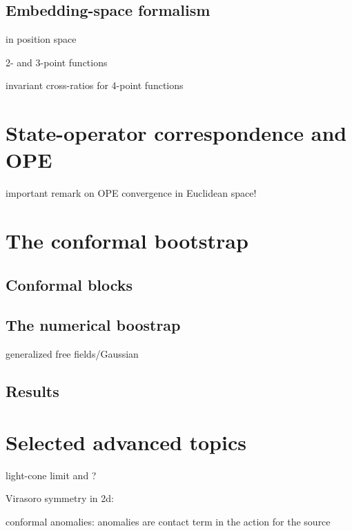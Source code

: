 \documentclass[a4paper,12pt]{article}
\numberwithin{equation}{section}
\begin{document}
\subsection{Embedding-space formalism}

in position space

2- and 3-point functions

invariant cross-ratios for 4-point functions


\section{State-operator correspondence and OPE}

important remark on OPE convergence in Euclidean space!


\section{The conformal bootstrap}

\subsection{Conformal blocks}

\subsection{The numerical boostrap}

generalized free fields/Gaussian

\subsection{Results}



\section{Selected advanced topics}

light-cone limit and ?

Virasoro symmetry in 2d:


conformal anomalies: anomalies are contact term in the action for the source


%
%
\end{document}
